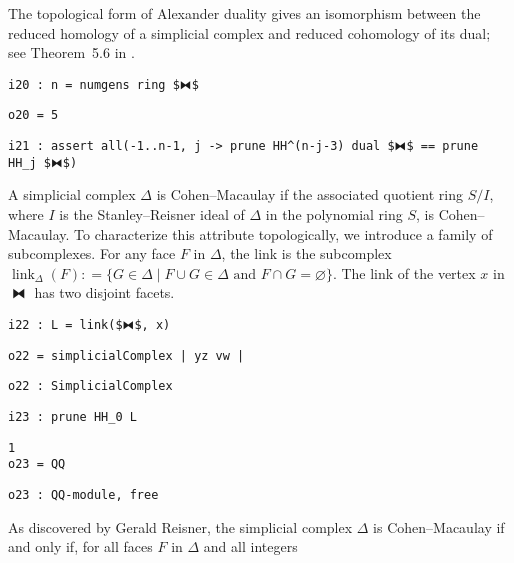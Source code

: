 \documentclass[12pt,leqno]{amsart}
\theoremstyle{definition}
\newcommand{\colequal}{\ensuremath{:\!=}}
\begin{document}
The topological form of Alexander duality gives an isomorphism
between the reduced homology of a simplicial complex and reduced cohomology of
its dual; see Theorem~5.6 in \cite{MS}.
\begin{lstlisting}[xleftmargin=10pt, aboveskip=3pt, belowskip=1.5pt]
i20 : n = numgens ring $⧓$
\end{lstlisting}
\begin{lstlisting}[xleftmargin=10pt, lineskip=-10pt, aboveskip=4pt, belowskip=1pt]
o20 = 5
\end{lstlisting}
\begin{lstlisting}[xleftmargin=10pt, aboveskip=1pt, belowskip=3pt]
i21 : assert all(-1..n-1, j -> prune HH^(n-j-3) dual $⧓$ == prune HH_j $⧓$)
\end{lstlisting}

A simplicial complex $\Delta$ is Cohen--Macaulay if the associated quotient
ring $S/I$, where $I$ is the Stanley--Reisner ideal of $\Delta$ in the
polynomial ring $S$, is Cohen--Macaulay.  To characterize this attribute
topologically, we introduce a family of subcomplexes.  For any face $F$ in
$\Delta$, the link is the subcomplex
$\operatorname{link}_\Delta(F) \colequal \{ G \in \Delta \mathrel{|}
\text{$F \cup G \in \Delta$ and $F \cap G = \varnothing$} \}$.  The link of
the vertex $x$ in $⧓$ has two disjoint facets.
\begin{lstlisting}[xleftmargin=10pt, aboveskip=3.0pt, belowskip=1.5pt]
i22 : L = link($⧓$, x)
\end{lstlisting}
\begin{lstlisting}[xleftmargin=10pt, aboveskip=1.5pt, belowskip=1.5pt]
o22 = simplicialComplex | yz vw |
\end{lstlisting}
\begin{lstlisting}[xleftmargin=10pt, aboveskip=1.5pt, belowskip=1.5pt]
o22 : SimplicialComplex
\end{lstlisting}
\begin{lstlisting}[xleftmargin=10pt, aboveskip=1.5pt, belowskip=1.5pt]
i23 : prune HH_0 L
\end{lstlisting}
\begin{lstlisting}[xleftmargin=10pt, lineskip=-10pt, aboveskip=4pt, belowskip=1pt]
        1
o23 = QQ
\end{lstlisting}
\begin{lstlisting}[xleftmargin=10pt, aboveskip=1.5pt, belowskip=3.0pt]
o23 : QQ-module, free
\end{lstlisting}
As discovered by Gerald Reisner, the simplicial complex $\Delta$ is
Cohen--Macaulay if and only if, for all faces $F$ in $\Delta$ and all integers
\end{document}
